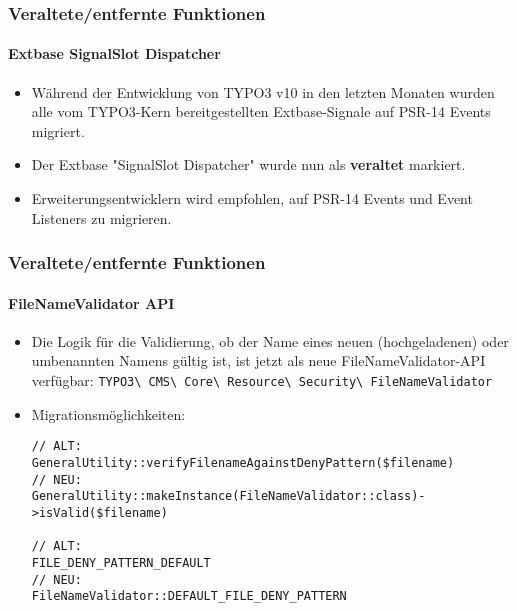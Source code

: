 \begin{frame}[fragile]
	\frametitle{Veraltete/entfernte Funktionen}
	\framesubtitle{Extbase SignalSlot Dispatcher}

	\begin{itemize}
		\item Während der Entwicklung von TYPO3 v10 in den letzten Monaten wurden
			alle vom TYPO3-Kern bereitgestellten Extbase-Signale auf PSR-14 Events migriert.
		\item Der Extbase "SignalSlot Dispatcher" wurde nun als \textbf{veraltet} markiert.
		\item Erweiterungsentwicklern wird empfohlen, auf PSR-14 Events und Event Listeners zu migrieren.
	\end{itemize}

\end{frame}


\begin{frame}[fragile]
	\frametitle{Veraltete/entfernte Funktionen}
	\framesubtitle{FileNameValidator API}

	\lstset{basicstyle=\tiny\ttfamily}

	\begin{itemize}
		\item Die Logik für die Validierung, ob der Name eines neuen (hochgeladenen) oder
			umbenannten Namens gültig ist, ist jetzt als neue FileNameValidator-API verfügbar:\newline
			\small
				\texttt{TYPO3\textbackslash
					CMS\textbackslash
					Core\textbackslash
					Resource\textbackslash
					Security\textbackslash
					FileNameValidator}
			\normalsize

		\item Migrationsmöglichkeiten:

\begin{lstlisting}
// ALT:
GeneralUtility::verifyFilenameAgainstDenyPattern($filename)
// NEU:
GeneralUtility::makeInstance(FileNameValidator::class)->isValid($filename)

// ALT:
FILE_DENY_PATTERN_DEFAULT
// NEU:
FileNameValidator::DEFAULT_FILE_DENY_PATTERN
\end{lstlisting}

	\end{itemize}

\end{frame}


